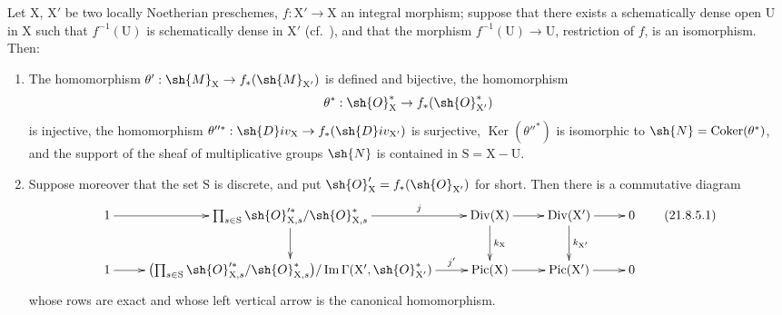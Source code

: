 
\begin{proposition}[21.8.5]
\label{IV.21.8.5}
Let $\mathrm{X}$, $\mathrm{X}'$ be two locally Noetherian preschemes, $f:\mathrm{X}'\to\mathrm{X}$ an integral morphism;
suppose that there exists a schematically dense open $\mathrm{U}$ in $\mathrm{X}$ such that $f^{-1}(\mathrm{U})$ is schematically dense in $\mathrm{X}'$ (cf.\ ), and that the morphism $f^{-1}(\mathrm{U})\to\mathrm{U}$, restriction of $f$, is an isomorphism.
Then:
\begin{enumerate}[label=(\roman*)]
  \item The homomorphism $\theta':\sh{M}_\mathrm{X}\to f_*(\sh{M}_{\mathrm{X}'})$ is defined and bijective, the homomorphism
\[
  \theta^*:\sh{O}^*_\mathrm{X}\to f_*(\sh{O}^*_{\mathrm{X}'})
\]
is injective, the homomorphism $\theta''^*:\sh{D}iv_\mathrm{X}\to f_*(\sh{D}iv_{\mathrm{X}'})$ is surjective, $\operatorname{Ker}(\theta''^*)$ is isomorphic to $\sh{N}=\operatorname{Coker}(\theta^*)$, and the support of the sheaf of multiplicative groups $\sh{N}$ is contained in $\mathrm{S}=\mathrm{X}-\mathrm{U}$.
  \item Suppose moreover that the set $\mathrm{S}$ is discrete, and put $\sh{O}'_\mathrm{X}=f_*(\sh{O}_{\mathrm{X}'})$ for short.
Then there is a commutative diagram
\[
\label{IV.21.8.5.1}
  \xymatrix{
    1 \ar[r] & \prod_{s\in\mathrm{S}}\sh{O}'^{*}_{\mathrm{X},s}/\sh{O}^*_{\mathrm{X},s} \ar[r]^-{j} \ar[d] & \operatorname{Div}(\mathrm{X}) \ar[r] \ar[d]^{k_\mathrm{X}} & \operatorname{Div}(\mathrm{X}') \ar[r] \ar[d]^{k_{\mathrm{X}'}} & 0\\
    1 \ar[r] & \bigl(\prod_{s\in\mathrm{S}}\sh{O}'^{*}_{\mathrm{X},s}/\sh{O}^*_{\mathrm{X},s}\bigr)/\operatorname{Im}\Gamma(\mathrm{X}',\sh{O}^*_{\mathrm{X}'}) \ar[r]^-{j'} & \operatorname{Pic}(\mathrm{X}) \ar[r] & \operatorname{Pic}(\mathrm{X}') \ar[r] & 0
  }
  \tag{21.8.5.1}
\]
whose rows are exact and whose left vertical arrow is the canonical homomorphism.
\end{enumerate}
\end{proposition}

